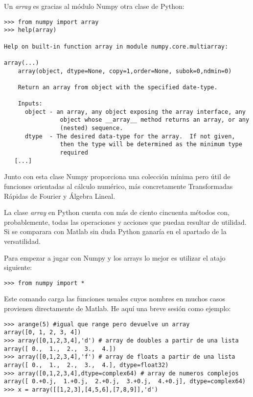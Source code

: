 \documentclass[a4paper,10pt]{article}
\begin{document}
Un \emph{array} es gracias al módulo Numpy otra clase de Python:

\begin{lstlisting}
>>> from numpy import array
>>> help(array)

Help on built-in function array in module numpy.core.multiarray:

array(...)
    array(object, dtype=None, copy=1,order=None, subok=0,ndmin=0)

    Return an array from object with the specified date-type.

    Inputs:
      object - an array, any object exposing the array interface, any
                object whose __array__ method returns an array, or any
                (nested) sequence.
      dtype  - The desired data-type for the array.  If not given,
                then the type will be determined as the minimum type
                required
   [...]
\end{lstlisting}

Junto con esta clase Numpy proporciona una colección mínima pero útil
de funciones orientadas al cálculo numérico, más concretamente
Transformadas Rápidas de Fourier y Álgebra Lineal.

La clase \emph{array} en Python cuenta con más de ciento cincuenta
métodos con, probablemente, todas las operaciones y acciones que
puedan resultar de utilidad. Si se comparara con Matlab sin duda
Python ganaría en el apartado de la versatilidad.

Para empezar a jugar con Numpy y los arrays lo mejor es utilizar el
atajo siguiente:

\begin{lstlisting}
>>> from numpy import *
\end{lstlisting}

Este comando carga las funciones usuales cuyos nombres en muchos casos
provienen directamente de Matlab.  He aquí una breve sesión como
ejemplo:

\begin{lstlisting}
>>> arange(5) #igual que range pero devuelve un array
array([0, 1, 2, 3, 4])
>>> array([0,1,2,3,4],'d') # array de doubles a partir de una lista
array([ 0.,  1.,  2.,  3.,  4.])
>>> array([0,1,2,3,4],'f') # array de floats a partir de una lista
array([ 0.,  1.,  2.,  3.,  4.], dtype=float32)
>>> array([0,1,2,3,4],dtype=complex64) # array de numeros complejos
array([ 0.+0.j,  1.+0.j,  2.+0.j,  3.+0.j,  4.+0.j], dtype=complex64)
>>> x = array([[1,2,3],[4,5,6],[7,8,9]],'d') 
\end{lstlisting}
\end{document}
